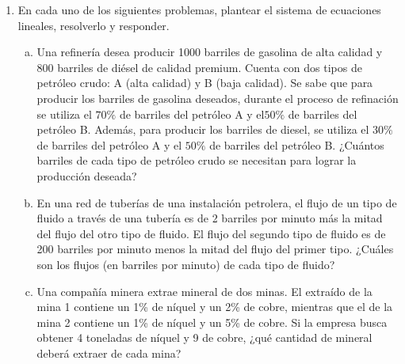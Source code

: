 \documentclass[11pt]{article}
\begin{document}
\begin{enumerate}[\hspace{-7mm} 1) ]
\begin{itemize}
    \item \textbf{Cálculo del ingreso y el costo:}  
    Sustituimos $ x = 500 $ en las fórmulas de ingreso y costo:
    \[
    I(500) = 50\cdot 500 - 10,000 = 25,000 - 10,000 = 15,000
    \]
    \[
    C(500) = 20\cdot 500  + 5,000 = 10,000 + 5,000 = 15,000
    \]

    Por lo tanto, cuando $ x = 500 $barriles:\quad   $I = C = 15,000$
\end{itemize}




\textbf{Respuesta:}  
La cantidad de petróleo que debe producirse para que los ingresos sean iguales a los costos es de $ 500 $ barriles. El ingreso y el costo en ese caso son ambos iguales a $ U\$D \,15,000 $.



\medskip




\item  En cada uno de los siguientes problemas, plantear el sistema de ecuaciones lineales, resolverlo
y responder.
\begin{enumerate}[a) ]
    \item Una refinería desea producir 1000 barriles de gasolina de alta calidad y 800 barriles de diésel de calidad premium. Cuenta con dos tipos de petróleo crudo: A (alta calidad) y B (baja calidad). Se sabe que para producir los barriles de gasolina deseados, durante
el proceso de refinación se utiliza el $70 \%$ de barriles del petróleo A y el$ 50 \%$  de barriles del petróleo B. Además, para producir los barriles de diesel, se utiliza el $30 \%$ de barriles del petróleo A y el $50 \%$ de barriles del petróleo B. ¿Cuántos barriles de cada tipo de petróleo crudo se necesitan para lograr la producción deseada? 



    \item En una red de tuberías de una instalación petrolera, el flujo de un tipo de fluido a través de una tubería es de 2 barriles por minuto más la mitad del flujo del otro tipo de fluido. El flujo del segundo tipo de fluido es de 200 barriles por minuto menos la mitad del flujo del primer tipo. ¿Cuáles son los flujos (en barriles por minuto) de cada tipo de fluido?

    
    \item Una compañía minera extrae mineral de dos minas. El extraído de la mina 1 contiene un 1\% de níquel y un 2\% de cobre, mientras que el de la mina 2 contiene un 1\% de níquel y un 5\% de cobre. Si la empresa busca obtener 4 toneladas de níquel y 9 de cobre, ¿qué cantidad de mineral deberá extraer de cada mina?
\end{enumerate}







\end{enumerate}
\end{document}
